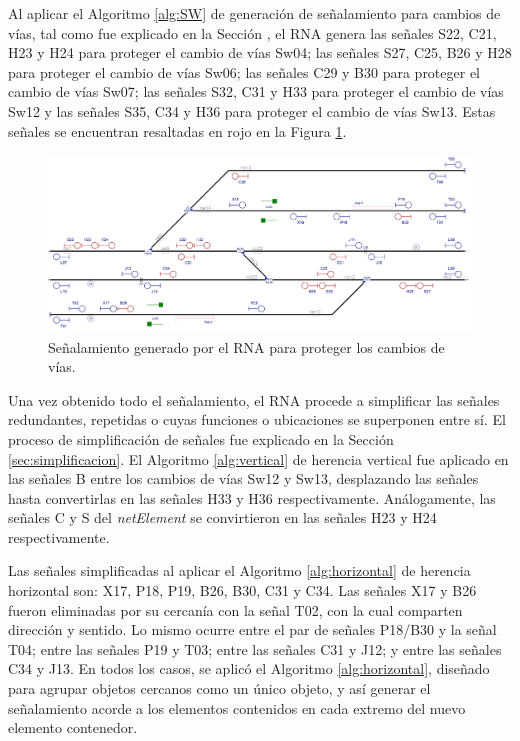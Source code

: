 	Al aplicar el Algoritmo \ref{alg:SW} de generación de señalamiento para cambios de vías, tal como fue explicado en la Sección \label{sec:signal_switches}, el RNA genera las señales S22, C21, H23 y H24 para proteger el cambio de vías Sw04; las señales S27, C25, B26 y H28 para proteger el cambio de vías Sw06; las señales C29 y B30 para proteger el cambio de vías Sw07; las señales S32, C31 y H33 para proteger el cambio de vías Sw12 y las señales S35, C34 y H36 para proteger el cambio de vías Sw13. Estas señales se encuentran resaltadas en rojo en la Figura \ref{fig:EJ1_6}.
	
	\begin{figure}[H]
		\centering
		\includegraphics[width=1\textwidth]{resultados-obtenidos/ejemplo1/images/1_step4.png}
		\centering\caption{Señalamiento generado por el RNA para proteger los cambios de vías.}
		\label{fig:EJ1_6}
	\end{figure}
	
	Una vez obtenido todo el señalamiento, el RNA procede a simplificar las señales redundantes, repetidas o cuyas funciones o ubicaciones se superponen entre sí. El proceso de simplificación de señales fue explicado en la Sección \ref{sec:simplificacion}. El Algoritmo \ref{alg:vertical} de herencia vertical fue aplicado en las señales B entre los cambios de vías Sw12 y Sw13, desplazando las señales hasta convertirlas en las señales H33 y H36 respectivamente. Análogamente, las señales C y S del \textit{netElement} se convirtieron en las señales H23 y H24 respectivamente.
	
	Las señales simplificadas al aplicar el Algoritmo \ref{alg:horizontal} de herencia horizontal son: X17, P18, P19, B26, B30, C31 y C34. Las señales X17 y B26 fueron eliminadas por su cercanía con la señal T02, con la cual comparten dirección y sentido. Lo mismo ocurre entre el par de señales P18/B30 y la señal T04; entre las señales P19 y T03; entre las señales C31 y J12; y entre las señales C34 y J13. En todos los casos, se aplicó el Algoritmo \ref{alg:horizontal}, diseñado para agrupar objetos cercanos como un único objeto, y así generar el señalamiento acorde a los elementos contenidos en cada extremo del nuevo elemento contenedor.
	
